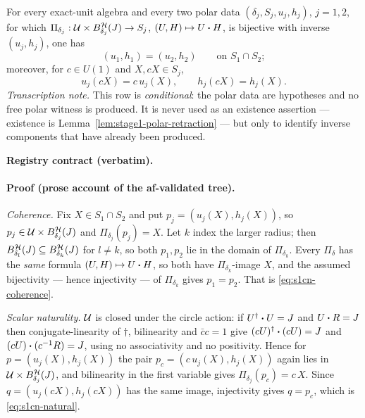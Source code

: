 \begin{lemma}\label{lem:stage1-polar-coherence-naturality}
For every exact-unit algebra and every two polar data $(\delta_j,S_j,u_j,h_j)$, $j=1,2$, for
which $\Pi_{\delta_j}:\mathcal U\times B^{\mathcal H}_{\delta_j}(J)\to S_j$,
$(U,H)\mapsto U\mathbin{\bm{\cdot}} H$, is bijective with inverse $(u_j,h_j)$, one has
\begin{equation}\label{eq:s1cn-coherence}
  (u_1,h_1)=(u_2,h_2)\qquad\text{on } S_1\cap S_2 ;
\end{equation}
moreover, for $c\in U(1)$ and $X,cX\in S_j$,
\begin{equation}\label{eq:s1cn-natural}
  u_j(cX)=c\,u_j(X),\qquad h_j(cX)=h_j(X).
\end{equation}
\emph{Transcription note.} This row is \emph{conditional}: the polar data are hypotheses and
no free polar witness is produced. It is never used as an existence assertion --- existence
is Lemma~\ref{lem:stage1-polar-retraction} --- but only to identify inverse components that
have already been produced.
\end{lemma}

\noindent\textbf{Registry contract (verbatim).}

\paragraph{Proof (prose account of the af-validated tree).}
\emph{Coherence.} Fix $X\in S_1\cap S_2$ and put $p_j=(u_j(X),h_j(X))$, so
$p_j\in\mathcal U\times B^{\mathcal H}_{\delta_j}(J)$ and $\Pi_{\delta_j}(p_j)=X$. Let $k$ index the
larger radius; then $B^{\mathcal H}_{\delta_l}(J)\subseteq B^{\mathcal H}_{\delta_k}(J)$ for
$l\ne k$, so both $p_1,p_2$ lie in the domain of $\Pi_{\delta_k}$. Every $\Pi_\delta$ has the
\emph{same} formula $(U,H)\mapsto U\mathbin{\bm{\cdot}} H$, so both have $\Pi_{\delta_k}$-image $X$, and the
assumed bijectivity --- hence injectivity --- of $\Pi_{\delta_k}$ gives $p_1=p_2$. That is
\eqref{eq:s1cn-coherence}.

\emph{Scalar naturality.} $\mathcal U$ is closed under the circle action: if $U^{\dagger}\mathbin{\bm{\cdot}} U=J$ and
$U\mathbin{\bm{\cdot}} R=J$ then conjugate-linearity of $\dagger$, bilinearity and $\bar cc=1$ give
$(cU)^{\dagger}\mathbin{\bm{\cdot}}(cU)=J$ and $(cU)\mathbin{\bm{\cdot}}(c^{-1}R)=J$, using no associativity and no positivity.
Hence for $p=(u_j(X),h_j(X))$ the pair $p_c=(c\,u_j(X),h_j(X))$ again lies in
$\mathcal U\times B^{\mathcal H}_{\delta_j}(J)$, and bilinearity in the first variable gives
$\Pi_{\delta_j}(p_c)=c\,X$. Since $q=(u_j(cX),h_j(cX))$ has the same image, injectivity
gives $q=p_c$, which is \eqref{eq:s1cn-natural}.

